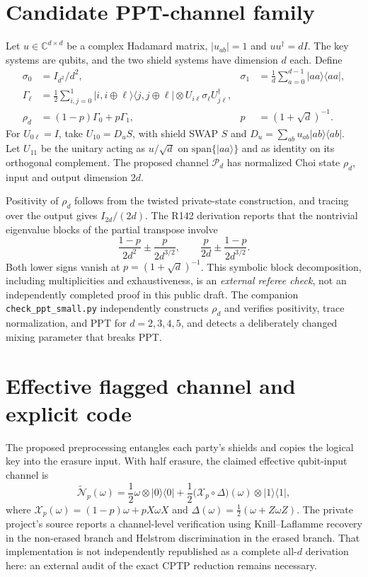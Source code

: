 \documentclass[11pt]{article}
\begin{document}
\section{Candidate PPT-channel family}
Let $u\in\mathbb C^{d\times d}$ be a complex Hadamard matrix, $|u_{ab}|=1$ and $uu^\dagger=dI$. The key systems are qubits, and the two shield systems have dimension $d$ each. Define
\begin{align}
\sigma_0&=I_{d^2}/d^2,&\sigma_1&=\frac1d\sum_{a=0}^{d-1}|aa\rangle\langle aa|,\\
\Gamma_\ell&=\frac12\sum_{i,j=0}^{1}|i,i\oplus\ell\rangle\langle j,j\oplus\ell|\otimes U_{i\ell}\sigma_\ell U_{j\ell}^\dagger,\\
\rho_d&=(1-p)\Gamma_0+p\Gamma_1,&p&=(1+\sqrt d)^{-1}.
\end{align}
For $U_{0\ell}=I$, take $U_{10}=D_u S$, with shield SWAP $S$ and $D_u=\sum_{ab}u_{ab}|ab\rangle\langle ab|$. Let $U_{11}$ be the unitary acting as $u/\sqrt d$ on $\mathrm{span}\{|aa\rangle\}$ and as identity on its orthogonal complement. The proposed channel $\mathcal P_d$ has normalized Choi state $\rho_d$, input and output dimension $2d$.

Positivity of $\rho_d$ follows from the twisted private-state construction, and tracing over the output gives $I_{2d}/(2d)$. The R142 derivation reports that the nontrivial eigenvalue blocks of the partial transpose involve
\begin{equation}
\frac{1-p}{2d^2}\pm\frac{p}{2d^{3/2}},\qquad
\frac{p}{2d}\pm\frac{1-p}{2d^{3/2}}.
\end{equation}
Both lower signs vanish at $p=(1+\sqrt d)^{-1}$. This symbolic block decomposition, including multiplicities and exhaustiveness, is an \emph{external referee check}, not an independently completed proof in this public draft. The companion \texttt{check\_ppt\_small.py} independently constructs $\rho_d$ and verifies positivity, trace normalization, and PPT for $d=2,3,4,5$, and detects a deliberately changed mixing parameter that breaks PPT.

\section{Effective flagged channel and explicit code}
The proposed preprocessing entangles each party's shields and copies the logical key into the erasure input. With half erasure, the claimed effective qubit-input channel is
\begin{equation}
\widetilde{\mathcal N}_p(\omega)=\frac12\omega\otimes|0\rangle\langle0|+\frac12\bigl(\mathcal X_p\circ\Delta\bigr)(\omega)\otimes|1\rangle\langle1|,
\end{equation}
where $\mathcal X_p(\omega)=(1-p)\omega+pX\omega X$ and $\Delta(\omega)=\tfrac12(\omega+Z\omega Z)$. The private project's source reports a channel-level verification using Knill--Laflamme recovery in the non-erased branch and Helstrom discrimination in the erased branch. That implementation is not independently republished as a complete all-$d$ derivation here: an external audit of the exact CPTP reduction remains necessary.
\end{document}

